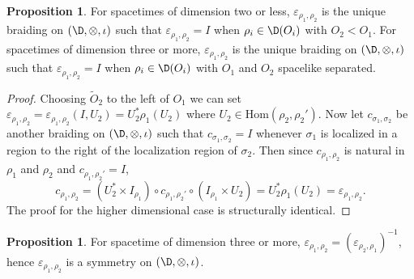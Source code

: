 \documentclass[11pt]{article}
\theoremstyle{definition}
\newtheorem{prop}[thm]{Proposition}
\theoremstyle{definition}
\theoremstyle{remark}
\newcommand{\ve}{\varepsilon}
\def\wt#1{{\tilde #1}}
\newcommand{\Hom}{\mathrm{Hom}}
\begin{document}
\begin{prop} \label{uniqsymm}
For spacetimes of dimension two or less, $\ve _{\rho _1,\rho _2}$ is the
  unique braiding on $(\D ,\otimes ,\iota )$ such that $\ve _{\rho _1,\rho _2}=I$ when
  $\rho _i\in \D (O_i)$ with $O_2<O_1$.  For spacetimes of dimension three or more,
  $\ve _{\rho _1,\rho _2}$ is the unique braiding on $(\D ,\otimes ,\iota )$ such
  that $\ve _{\rho _1,\rho _2}=I$ when $\rho _i\in \D (O_i)$ with $O_1$ and $O_2$
  spacelike separated.  \end{prop}

\begin{proof} Choosing $\wt O_2$ to the left of $O_1$ we can set $\ve _{\rho _1,\rho
    _2}=\ve _{\rho _1,\rho _2}(I,U_2)=U_2^*\rho _1(U_2)$ where $U_2\in \Hom (\rho
  _2,\rho _2')$.  Now let $c _{\sigma _1,\sigma _2}$ be another braiding on $(\D
  ,\otimes ,\iota )$ such that $c _{\sigma _1,\sigma _2}=I$ whenever $\sigma _1$ is
  localized in a region to the right of the localization region of $\sigma _2$.  Then
  since $c_{\rho _1,\rho _2}$ is natural in $\rho _1$ and $\rho _2$ and $c _{\rho
    _1,\rho _2'}=I$,
$$ c_{\rho _1,\rho _2}=  (U_2^*\times I_{\rho _1})\circ c_{\rho _1,\rho _2'}\circ
(I_{\rho _1}\times U_2) = U_2^*\rho _1(U_2)=\ve _{\rho _1,\rho _2} .$$ The proof for
the higher dimensional case is structurally identical.
\end{proof}

\begin{prop} For spacetime of dimension three or more, $\ve _{\rho _1,\rho _2}=(\ve
  _{\rho _2,\rho _1})^{-1}$, hence $\ve _{\rho _1,\rho _2}$ is a symmetry on $(\D
  ,\otimes ,\iota )$.  \end{prop}
\end{document}
